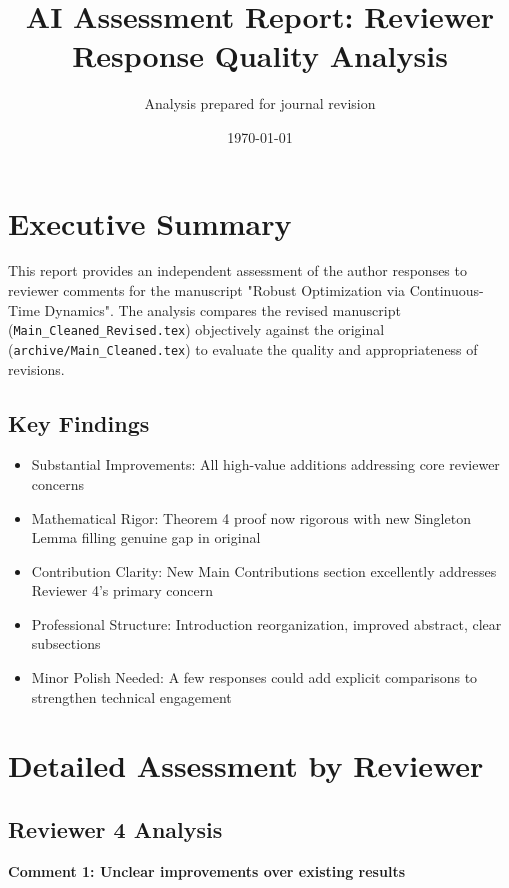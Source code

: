 \documentclass[11pt]{article}
\title{AI Assessment Report: Reviewer Response Quality Analysis}
\author{Analysis prepared for journal revision}
\date{\today}
\begin{document}
\maketitle

\section{Executive Summary}

This report provides an independent assessment of the author responses to reviewer comments for the manuscript "Robust Optimization via Continuous-Time Dynamics". The analysis compares the revised manuscript (\texttt{Main\_Cleaned\_Revised.tex}) objectively against the original (\texttt{archive/Main\_Cleaned.tex}) to evaluate the quality and appropriateness of revisions.

\subsection{Key Findings}

\begin{itemize}
\item \textcolor{success}{Substantial Improvements}: All high-value additions addressing core reviewer concerns
\item \textcolor{success}{Mathematical Rigor}: Theorem 4 proof now rigorous with new Singleton Lemma filling genuine gap in original
\item \textcolor{success}{Contribution Clarity}: New Main Contributions section excellently addresses Reviewer 4's primary concern
\item \textcolor{success}{Professional Structure}: Introduction reorganization, improved abstract, clear subsections
\item \textcolor{warning}{Minor Polish Needed}: A few responses could add explicit comparisons to strengthen technical engagement
\end{itemize}

\section{Detailed Assessment by Reviewer}

\subsection{Reviewer 4 Analysis}

\textbf{Comment 1: Unclear improvements over existing results}
\end{document}
